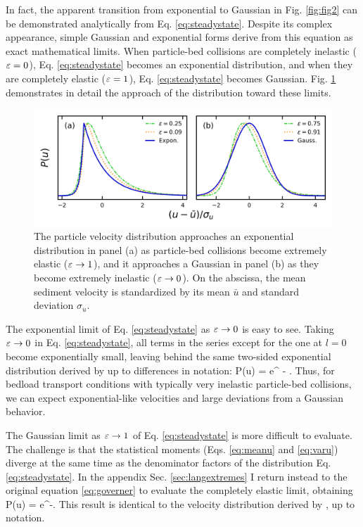In fact, the apparent transition from exponential to Gaussian in Fig. \ref{fig:fig2} can be demonstrated analytically from Eq. \ref{eq:steadystate}. Despite its complex appearance, simple Gaussian and exponential forms derive from this equation as exact mathematical limits.
When particle-bed collisions are completely inelastic ($\varepsilon = 0$), Eq. \ref{eq:steadystate} becomes an exponential distribution, and when they are completely elastic ($\varepsilon = 1$), Eq. \ref{eq:steadystate} becomes Gaussian.
Fig. \ref{fig:fig3} demonstrates in detail the approach of the distribution toward these limits.
\begin{figure}
	\centerline{\includegraphics{./figures/ch5/Fig3asymptotic.png}}
	\caption{The particle velocity distribution approaches an exponential distribution in panel (a) as particle-bed collisions become extremely elastic ($\varepsilon \rightarrow 1$), and it approaches a Gaussian in panel (b) as they become extremely inelastic ($\varepsilon \rightarrow 0$). On the abscissa, the mean sediment velocity is standardized by its mean $\bar{u}$ and standard deviation $\sigma_u$. }
	\label{fig:fig3}
\end{figure}

The exponential limit of Eq. \ref{eq:steadystate} as $\varepsilon \rightarrow 0$ is easy to see. Taking $\varepsilon \rightarrow 0 $ in Eq. \ref{eq:steadystate}, all terms in the series except for the one at $l=0$ become exponentially small, leaving behind the same two-sided exponential distribution derived by \cite{Fan2014} up to differences in notation:
\be P(u) = e^{ - }. \ee
Thus, for bedload transport conditions with typically very inelastic particle-bed collisions, we can expect exponential-like velocities and large deviations from a Gaussian behavior.

The Gaussian limit as $\varepsilon \rightarrow 1$ of Eq. \ref{eq:steadystate} is more difficult to evaluate. The challenge is that the statistical moments (Eqs. \ref{eq:meanu} and \ref{eq:varu}) diverge at the same time as the denominator factors of the distribution Eq. \ref{eq:steadystate}. In the appendix Sec. \ref{sec:langextremes} I return instead to the original equation \ref{eq:governer} to evaluate the completely elastic limit, obtaining
\be P(u) = e^{-}. \label{eq:gaussian}\ee
This result is identical to the velocity distribution derived by \citet{Ancey2014}, up to notation.

